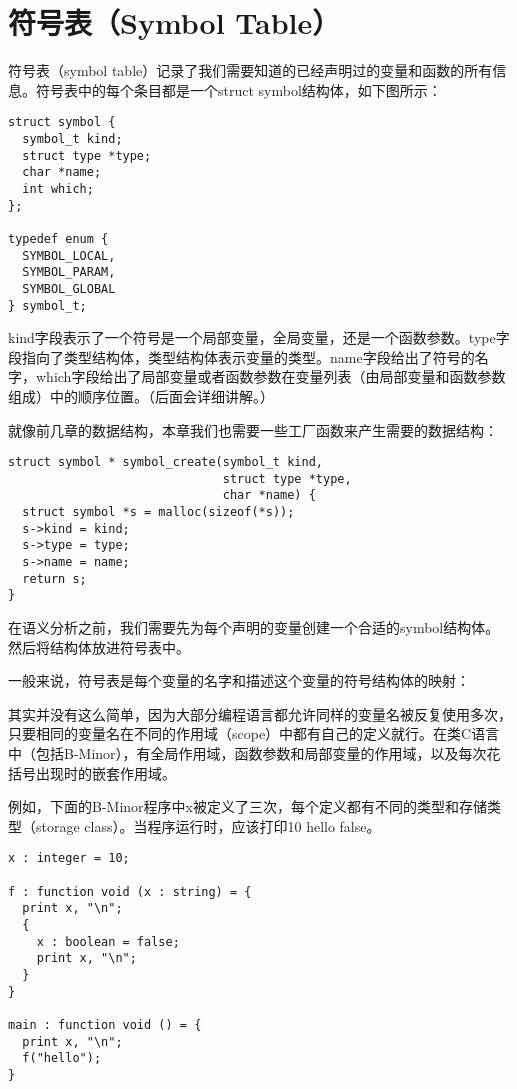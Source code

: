 \documentclass[cn,11pt,chinese]{elegantbook}
\begin{document}
\section{符号表（Symbol Table）}

符号表（symbol table）记录了我们需要知道的已经声明过的变量和函数的所有信息。符号表中的每个条目都是一个struct symbol结构体，如下图所示：

\begin{verbatim}
struct symbol {
  symbol_t kind;
  struct type *type;
  char *name;
  int which;
};

typedef enum {
  SYMBOL_LOCAL,
  SYMBOL_PARAM,
  SYMBOL_GLOBAL
} symbol_t;
\end{verbatim}

kind字段表示了一个符号是一个局部变量，全局变量，还是一个函数参数。type字段指向了类型结构体，类型结构体表示变量的类型。name字段给出了符号的名字，which字段给出了局部变量或者函数参数在变量列表（由局部变量和函数参数组成）中的顺序位置。（后面会详细讲解。）

就像前几章的数据结构，本章我们也需要一些工厂函数来产生需要的数据结构：

\begin{verbatim}
struct symbol * symbol_create(symbol_t kind,
                              struct type *type,
                              char *name) {
  struct symbol *s = malloc(sizeof(*s));
  s->kind = kind;
  s->type = type;
  s->name = name;
  return s;
}
\end{verbatim}

在语义分析之前，我们需要先为每个声明的变量创建一个合适的symbol结构体。然后将结构体放进符号表中。

一般来说，符号表是每个变量的名字和描述这个变量的符号结构体的映射：

其实并没有这么简单，因为大部分编程语言都允许同样的变量名被反复使用多次，只要相同的变量名在不同的作用域（scope）中都有自己的定义就行。在类C语言中（包括B-Minor），有全局作用域，函数参数和局部变量的作用域，以及每次花括号出现时的嵌套作用域。

例如，下面的B-Minor程序中x被定义了三次，每个定义都有不同的类型和存储类型（storage class）。当程序运行时，应该打印10 hello false。

\begin{verbatim}
x : integer = 10;

f : function void (x : string) = {
  print x, "\n";
  {
    x : boolean = false;
    print x, "\n";
  }
}

main : function void () = {
  print x, "\n";
  f("hello");
}
\end{verbatim}
\end{document}
